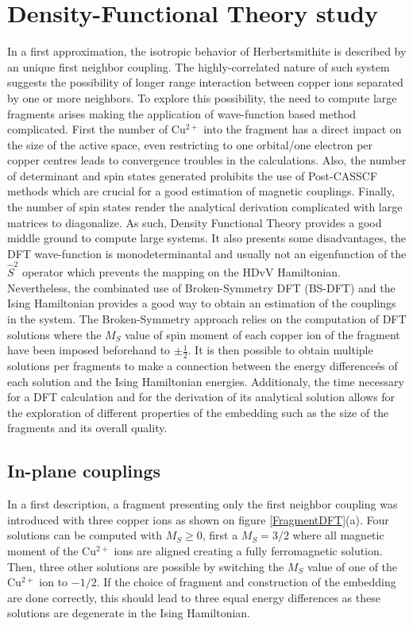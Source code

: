 \documentclass[10pt]{report}
\numberwithin{equation}{section}
\begin{document}
\section{Density-Functional Theory study}

In a first approximation, the isotropic behavior of Herbertsmithite is described by an unique first neighbor coupling. 
The highly-correlated nature of such system suggests the possibility of longer range interaction between copper ions separated by one or more neighbors. 
To explore this possibility, the need to compute large fragments arises making the application of wave-function based method complicated.
First the number of Cu$^{2+}$ into the fragment has a direct impact on the size of the active space, even restricting to one orbital/one electron per copper centres leads to convergence troubles in the calculations.
Also, the number of determinant and spin states generated prohibits the use of Post-CASSCF methods which are crucial for a good estimation of magnetic couplings.
Finally, the number of spin states render the analytical derivation complicated with large matrices to diagonalize.
As such, Density Functional Theory provides a good middle ground to compute large systems. 
It also presents some disadvantages, the DFT wave-function is monodeterminantal and usually not an eigenfunction of the $\hat{S}^2$ operator which prevents the mapping on the HDvV Hamiltonian.
Nevertheless, the combinated use of Broken-Symmetry DFT (BS-DFT) and the Ising Hamiltonian provides a good way to obtain an estimation of the couplings in the system.
The Broken-Symmetry approach relies on the computation of DFT solutions where the $M_S$ value of spin moment of each copper ion of the fragment have been imposed beforehand to $\pm \frac{1}{2}$. 
It is then possible to obtain multiple solutions per fragments to make a connection between the energy differenceés of each solution and the Ising Hamiltonian energies.
Additionaly, the time necessary for a DFT calculation and for the derivation of its analytical solution allows for the exploration of different properties of the embedding such as the size of the fragments and its overall quality.


\subsection*{In-plane couplings}

In a first description, a fragment presenting only the first neighbor coupling was introduced with three copper ions as shown on figure \ref{FragmentDFT}(a).
Four solutions can be computed with $M_S$$\ge$$0$, first a $M_S=3/2$ where all magnetic moment of the Cu$^{2+}$ ions are aligned creating a fully ferromagnetic solution. 
Then, three other solutions are possible by switching the $M_S$ value of one of the Cu$^{2+}$ ion to $-1/2$. 
If the choice of fragment and construction of the embedding are done correctly, this should lead to three equal energy differences as these solutions are degenerate in the Ising Hamiltonian.
\end{document}
